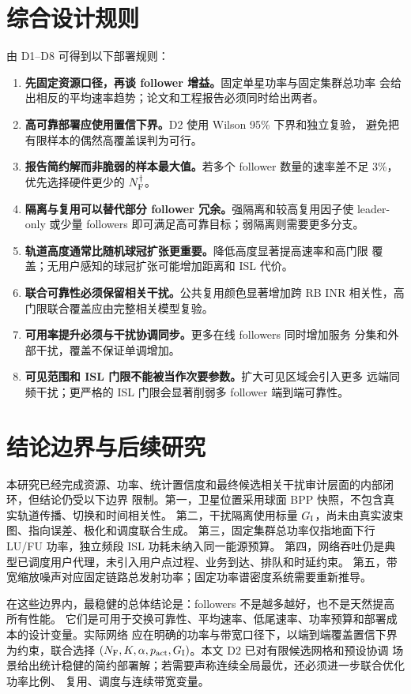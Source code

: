 \documentclass[UTF8,a4paper,11pt]{ctexart}
\begin{document}
\section{综合设计规则}

由 D1--D8 可得到以下部署规则：
\begin{enumerate}
  \item \textbf{先固定资源口径，再谈 follower 增益。}固定单星功率与固定集群总功率
  会给出相反的平均速率趋势；论文和工程报告必须同时给出两者。
  \item \textbf{高可靠部署应使用置信下界。}D2 使用 Wilson 95\% 下界和独立复验，
  避免把有限样本的偶然高覆盖误判为可行。
  \item \textbf{报告简约解而非脆弱的样本最大值。}若多个 follower 数量的速率差不足
  3\%，优先选择硬件更少的 $N_{\rm F}^{\dagger}$。
  \item \textbf{隔离与复用可以替代部分 follower 冗余。}强隔离和较高复用因子使
  leader-only 或少量 followers 即可满足高可靠目标；弱隔离则需要更多分支。
  \item \textbf{轨道高度通常比随机球冠扩张更重要。}降低高度显著提高速率和高门限
  覆盖；无用户感知的球冠扩张可能增加距离和 ISL 代价。
  \item \textbf{联合可靠性必须保留相关干扰。}公共复用颜色显著增加跨 RB INR
  相关性，高门限联合覆盖应由完整相关模型复验。
  \item \textbf{可用率提升必须与干扰协调同步。}更多在线 followers 同时增加服务
  分集和外部干扰，覆盖不保证单调增加。
  \item \textbf{可见范围和 ISL 门限不能被当作次要参数。}扩大可见区域会引入更多
  远端同频干扰；更严格的 ISL 门限会显著削弱多 follower 端到端可靠性。
\end{enumerate}

\section{结论边界与后续研究}

本研究已经完成资源、功率、统计置信度和最终候选相关干扰审计层面的内部闭环，但结论仍受以下边界
限制。第一，卫星位置采用球面 BPP 快照，不包含真实轨道传播、切换和时间相关性。
第二，干扰隔离使用标量 $G_{\rm I}$，尚未由真实波束图、指向误差、极化和调度联合生成。
第三，固定集群总功率仅指地面下行 LU/FU 功率，独立频段 ISL 功耗未纳入同一能源预算。
第四，网络吞吐仍是典型已调度用户代理，未引入用户点过程、业务到达、排队和时延约束。
第五，带宽缩放噪声对应固定链路总发射功率；固定功率谱密度系统需要重新推导。

在这些边界内，最稳健的总体结论是：followers 不是越多越好，也不是天然提高所有性能。
它们是可用于交换可靠性、平均速率、低尾速率、功率预算和部署成本的设计变量。实际网络
应在明确的功率与带宽口径下，以端到端覆盖置信下界为约束，联合选择
$(N_{\rm F},K,\alpha,p_{\rm act},G_{\rm I})$。本文 D2 已对有限候选网格和预设协调
场景给出统计稳健的简约部署解；若需要声称连续全局最优，还必须进一步联合优化功率比例、
复用、调度与连续带宽变量。
\end{document}
